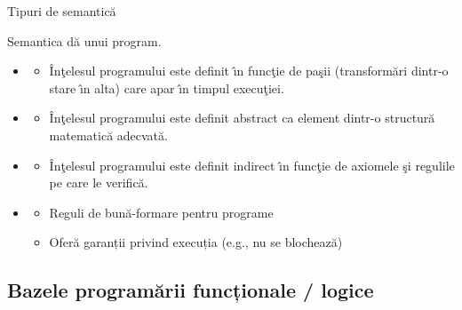 \documentclass[xcolor=x11names,compress,10pt]{beamer}
\begin{document}
\begin{frame}{ Tipuri de semantic\u a}

Semantica d\u a  unui program.
\medskip \pause
\begin{itemize}
	\item {}
	\begin{itemize}
		\item \^In\c telesul programului este definit \^\i n func\c tie de pa\c sii (transform\u ari dintr-o stare \^\i n alta) care apar \^\i n timpul execu\c tiei.
	\end{itemize}
	\medskip \pause
	\item {}
	\begin{itemize}
		\item \^In\c telesul programului este definit abstract ca element dintr-o structur\u a matematic\u a adecvat\u a.
	\end{itemize}
	\medskip \pause
	\item {}
	\begin{itemize}
		\item \^In\c telesul programului este definit indirect \^\i n func\c tie de axiomele \c si regulile  pe care le verific\u a.
	\end{itemize}
	\medskip \pause
	\item {}
	\begin{itemize}
		\item Reguli de bună-formare pentru programe
		\item Oferă garanții privind execuția (e.g., nu se blochează)
	\end{itemize}
	
	\end{itemize}
	

\end{frame}


\subsection{Bazele programării funcționale / logice}\subsectionframe
\end{document}
